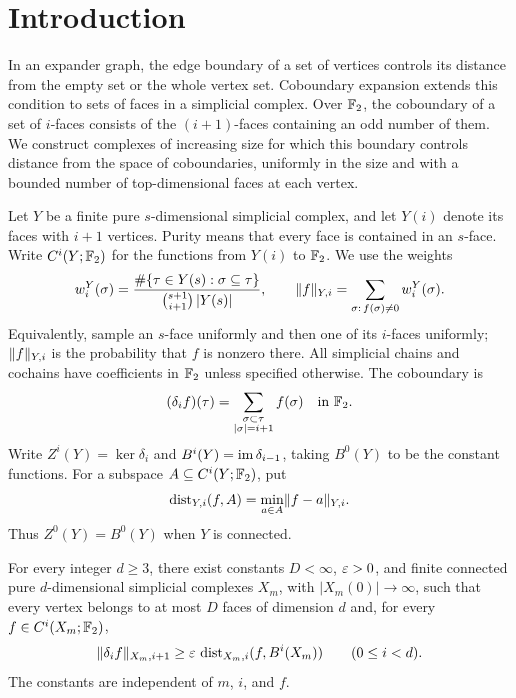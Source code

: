 \section{Introduction}
\label{sec:introduction}

In an expander graph, the edge boundary of a set of vertices controls
its distance from the empty set or the whole vertex set. Coboundary
expansion extends this condition to sets of faces in a simplicial
complex. Over $\mathbb F_2$, the coboundary of a set of $i$-faces consists of
the $(i+1)$-faces containing an odd number of them. We construct
complexes of increasing size for which this boundary controls distance
from the space of coboundaries, uniformly in the size and with a bounded
number of top-dimensional faces at each vertex.

Let $Y$ be a finite pure $s$-dimensional simplicial complex, and let $Y(i)$
denote its faces with $i+1$ vertices. Purity means that every face is
contained in an $s$-face. Write $C^i(Y;\mathbb F_2)$ for the functions from
$Y(i)$ to $\mathbb F_2$. We use the weights
\begin{equation}\label{eq:weights}
 w_i^Y(\sigma)=
 \frac{\#\{\tau\in Y(s):\sigma\subseteq\tau\}}
 {\binom{s+1}{i+1}\,|Y(s)|},
 \qquad
 \lVert f\rVert_{Y,i}=\sum_{\sigma:\,f(\sigma)\ne0}w_i^Y(\sigma).
\end{equation}
Equivalently, sample an $s$-face uniformly and then one of its $i$-faces
uniformly; $\lVert f\rVert_{Y,i}$ is the probability that $f$ is nonzero there.
All simplicial chains and cochains have coefficients in $\mathbb F_2$ unless
specified otherwise. The coboundary is
\[
 (\delta_i f)(\tau)=\sum_{\substack{\sigma\subset\tau\\|\sigma|=i+1}}
 f(\sigma)\quad\text{in }\mathbb F_2.
\]
Write $Z^i(Y)=\ker\delta_i$ and
$B^i(Y)=\operatorname{im}\delta_{i-1}$, taking $B^0(Y)$ to be the constant functions.
For a subspace $A\subseteq C^i(Y;\mathbb F_2)$, put
\[
 \operatorname{dist}_{Y,i}(f,A)=\min_{a\in A}\lVert f-a\rVert_{Y,i}.
\]
Thus $Z^0(Y)=B^0(Y)$ when $Y$ is connected.

\begin{theorem}\label{thm:main}
For every integer $d\ge3$, there exist constants $D<\infty$, $\varepsilon>0$,
and finite connected pure $d$-dimensional simplicial complexes $X_m$,
with $|X_m(0)|\longrightarrow\infty$, such that every vertex belongs to
at most $D$ faces of dimension $d$ and, for every
$f\in C^i(X_m;\mathbb F_2)$,
\begin{equation}\label{eq:goal}
 \lVert\delta_i f\rVert_{X_m,i+1}
 \ge \varepsilon\,\operatorname{dist}_{X_m,i}(f,B^i(X_m))
 \qquad(0\le i<d).
\end{equation}
The constants are independent of $m$, $i$, and $f$.
\end{theorem}

